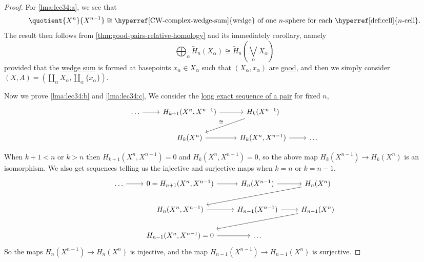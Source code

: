 \begin{proof}
	For \autoref{lma:lec34:a}, we see that
	\[
		\quotient{X^n}{X^{n-1}} \cong \text{\hyperref[CW-complex-wedge-sum]{wedge} of one \(n\)-sphere for each \hyperref[def:cell]{\(n\)-cell}}.
	\]
	The result then follows from \autoref{thm:good-pairs-relative-homology} and its immediately corollary, namely
	\[
		\bigoplus_\alpha \widetilde{H} _n(X_\alpha )\cong \widetilde{H} _n\left(\bigvee_\alpha X_\alpha \right)
	\]
	provided that the \hyperref[CW-complex-wedge-sum]{wedge sum} is formed at basepoints \(x_\alpha \in X_\alpha \) such that \((X_\alpha , x_\alpha )\) are \hyperref[def:good-pair]{good}, and then we simply consider \((X, A) = (\coprod_{\alpha } X_\alpha , \coprod_{\alpha } \{x_\alpha\})\).

	Now we prove \autoref{lma:lec34:b} and \autoref{lma:lec34:c}, We consider the \hyperref[thm:long-exact-sequence-of-a-pair]{long exact sequence of a pair} for fixed \(n\),
	\[
		\begin{tikzcd}
			\dots & {H_{k+1}(X^n, X^{n-1})} & {H_k(X^{n-1})} \\
			& {H_k(X^n)} & {H_k(X^n, X^{n-1})} & \dots
			\arrow[from=1-1, to=1-2]
			\arrow[from=1-2, to=1-3]
			\arrow["\cong"', from=1-3, to=2-2]
			\arrow[from=2-2, to=2-3]
			\arrow[from=2-3, to=2-4]
		\end{tikzcd}
	\]

	When \(k + 1 < n\) or \(k > n\) then \(H_{k + 1}(X^n, X^{n - 1}) = 0\) and \(H_k(X^n, X^{n - 1}) = 0\), so the above map \(H_k(X^{n - 1}) \to H_k(X^n)\) is an isomorphism. We also get sequences telling us the injective and surjective maps when \(k = n\) or \(k = n - 1\),
	\[
		\begin{tikzcd}
			\dots & {0=H_{n+1}(X^n, X^{n-1})} & {H_n(X^{n-1})} & {H_n(X^n)} \\
			& {H_{n}(X^n, X^{n-1})} & {H_{n-1}(X^{n-1})} & {H_{n-1}(X^n)} \\
			& {H_{n-1}(X^n, X^{n-1})=0} & \dots
			\arrow[from=1-1, to=1-2]
			\arrow[from=1-2, to=1-3]
			\arrow[from=1-3, to=1-4]
			\arrow[from=1-4, to=2-2]
			\arrow[from=2-2, to=2-3]
			\arrow[from=2-3, to=2-4]
			\arrow[from=2-4, to=3-2]
			\arrow[from=3-2, to=3-3]
		\end{tikzcd}
	\]
	So the maps \(H_n(X^{n - 1}) \to H_n(X^n)\) is injective, and the map \(H_{n - 1}(X^{n - 1}) \to H_{n - 1}(X^n)\) is surjective.


\end{proof}

